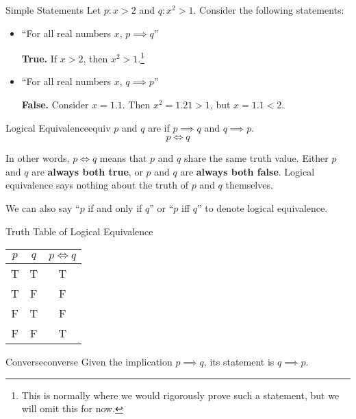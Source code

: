 \begin{exbox}{Simple Statements}{}
    Let $p : x > 2$ and $q : x^2 > 1$. Consider the following statements:
    \begin{itemize}
        \item ``For all real numbers $x$, $p \implies q$''

        \textbf{True.} If $x > 2$, then $x^2 > 1$.\footnote{This is normally where we would rigorously prove such a statement, but we will omit this for now.}

        \item ``For all real numbers $x$, $q \implies p$''

        \textbf{False.} Consider $x = 1.1$. Then $x^2 = 1.21 > 1$, but $x = 1.1 < 2$.
    \end{itemize}
\end{exbox}

\begin{dfnbox}{Logical Equivalence}{equiv}
    $p$ and $q$ are  if $p \implies q$ and $q \implies p$.
    \tcblower
    \[ p \iff q \]
\end{dfnbox}

In other words, $p \iff q$ means that $p$ and $q$ share the same truth value. Either $p$ and $q$ are \textbf{always both true}, or $p$ and $q$ are \textbf{always both false}. Logical equivalence says nothing about the truth of $p$ and $q$ themselves.

We can also say ``$p$ if and only if $q$'' or ``$p$ iff $q$'' to denote logical equivalence.

\begin{exbox}{Truth Table of Logical Equivalence}{}
    \begin{center}\begin{tabular}{c | c || c}
        $p$ & $q$ & $p \iff q$ \\ \hline
        T & T & T \\
        T & F & F \\
        F & T & F \\
        F & F & T
    \end{tabular}\end{center}
\end{exbox}

\begin{dfnbox}{Converse}{converse}
    Given the implication $p \implies q$, its  statement is $q \implies p$.
\end{dfnbox}

